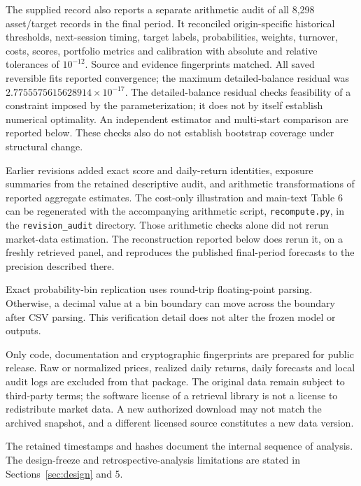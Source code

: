 The supplied record also reports a separate arithmetic audit of all 8,298 asset/target records in the final
period. It reconciled origin-specific historical thresholds, next-session timing,
target labels, probabilities, weights, turnover, costs, scores, portfolio metrics
and calibration with absolute and relative tolerances of $10^{-12}$.
Source and evidence fingerprints matched. All saved reversible fits reported
convergence; the maximum detailed-balance residual was
$2.7755575615628914\times10^{-17}$. The detailed-balance residual checks feasibility of a constraint imposed by the parameterization; it does not by itself establish numerical optimality. An independent estimator and multi-start comparison are reported below. These checks also do not establish bootstrap coverage under structural change.

Earlier revisions added exact score and daily-return identities, exposure summaries from the retained descriptive audit, and arithmetic transformations of reported aggregate estimates. The cost-only illustration and main-text Table 6 can be regenerated with the accompanying arithmetic script, \texttt{recompute.py}, in the \texttt{revision\_audit} directory. Those arithmetic checks alone did not rerun market-data estimation. The reconstruction reported below does rerun it, on a freshly retrieved panel, and reproduces the published final-period forecasts to the precision described there.

Exact probability-bin replication uses round-trip floating-point parsing.
Otherwise, a decimal value at a bin boundary can move across the boundary after
CSV parsing. This verification detail does not alter the frozen model or outputs.

Only code, documentation and cryptographic fingerprints are prepared for public
release. Raw or normalized prices, realized daily returns, daily forecasts and
local audit logs are excluded from that package. The original data remain subject
to third-party terms; the software license of a retrieval library is not a license
to redistribute market data. A new authorized download may not match the archived
snapshot, and a different licensed source constitutes a new data version.

The retained timestamps and hashes document the internal sequence of analysis. The design-freeze and retrospective-analysis limitations are stated in Sections~\ref{sec:design} and 5.

